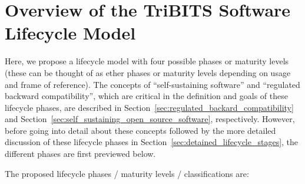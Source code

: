 \documentclass[11pt]{SANDreport}
\begin{document}
%
{}\section{Overview of the TriBITS Software Lifecycle Model}
\label{sec:life_cycle_overview}
%

Here, we propose a lifecycle model with four possible phases or
maturity levels (these can be thought of as ether phases or maturity
levels depending on usage and frame of reference).  The concepts of
``self-sustaining software'' and ``regulated backward compatibility'',
which are critical in the definition and goals of these lifecycle
phases, are described in
Section~\ref{sec:regulated_backard_compatibility} and
Section~\ref{sec:self_sustaining_open_source_software}, respectively.
However, before going into detail about these concepts followed by the
more detailed discussion of these lifecycle phases in
Section~\ref{sec:detained_lifecycle_stages}, the different phases are
first previewed below.

The proposed lifecycle phases / maturity levels / classifications are:
\end{document}

